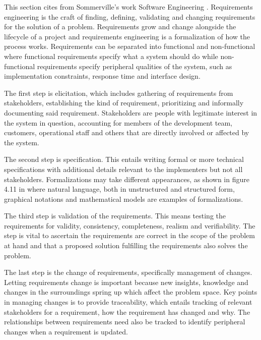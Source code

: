 This section cites from Sommerville's work Software Engineering \cite{sommerville-software-engineering}.
Requirements engineering is the craft of finding, defining,
validating and changing requirements for the solution of a problem.
Requirements grow and change alongside the lifecycle of a project
and requirements engineering is a formalization of how the process
works. Requirements can be separated into functional and
non-functional where functional requirements specify what a system
should do while non-functional requirements specify peripheral
qualities of the system, such as implementation constraints,
response time and interface design.

The first step is elicitation, which includes gathering of
requirements from stakeholders, establishing the kind of
requirement, prioritizing and informally documenting said
requirement. Stakeholders are people with legitimate interest in
the system in question, accounting for members of the development
team, customers, operational staff and others that are directly
involved or affected by the system. 

The second step is specification. This entails writing formal or
more technical specifications with additional details relevant to
the implementers but not all stakeholders. Formalizations may take
different appearances, as shown in figure 4.11 in \cite{sommerville-software-engineering}
where natural language, both in unstructured and structured form,
graphical notations and mathematical models are examples of
formalizations.

The third step is validation of the requirements. This means
testing the requirements for validity, consistency, completeness,
realism and verifiability. The step is vital to ascertain the
requirements are correct in the scope of the problem at hand and
that a proposed solution fulfilling the requirements also solves
the problem.

The last step is the change of requirements, specifically
management of changes. Letting requirements change is important
because new insights, knowledge and changes in the surroundings
spring up which affect the problem space. Key points in managing
changes is to provide traceability, which entails tracking of
relevant stakeholders for a requirement, how the requirement has
changed and why. The relationships between requirements need also
be tracked to identify peripheral changes when a requirement is
updated.
